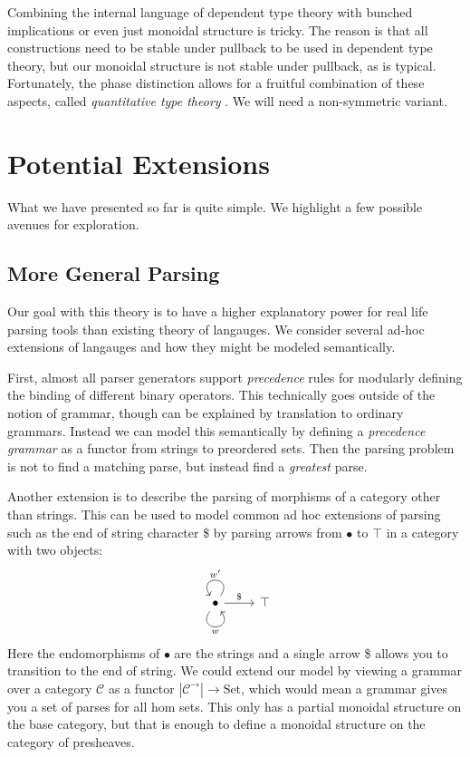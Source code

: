 \documentclass[12pt]{article}
\newcommand{\Set}{\textrm{Set}}
\begin{document}
Combining the internal language of dependent type theory with bunched
implications or even just monoidal structure is tricky. The reason is
that all constructions need to be stable under pullback to be used in
dependent type theory, but our monoidal structure is not stable under
pullback, as is typical.
%
Fortunately, the phase distinction allows for a fruitful combination
of these aspects, called \emph{quantitative type theory}
\cite{atkey-qtt,mcbride-nuttin}.
%
We will need a non-symmetric variant.

\section{Potential Extensions}

What we have presented so far is quite simple. We highlight a few
possible avenues for exploration.

\subsection{More General Parsing}

Our goal with this theory is to have a higher explanatory power for
real life parsing tools than existing theory of langauges. We consider
several ad-hoc extensions of langauges and how they might be modeled
semantically.

First, almost all parser generators support \emph{precedence} rules
for modularly defining the binding of different binary operators.
This technically goes outside of the notion of grammar, though can be
explained by translation to ordinary grammars.
%
Instead we can model this semantically by defining a \emph{precedence
grammar} as a functor from strings to preordered sets. Then the
parsing problem is not to find a matching parse, but instead find a
\emph{greatest} parse.

Another extension is to describe the parsing of morphisms of a
category other than strings. This can be used to model common ad hoc
extensions of parsing such as the end of string character \$ by
parsing arrows from $\bullet$ to $\top$ in a category with two
objects:
\[%
\begin{tikzcd}
\bullet \arrow[r, "\$"] \arrow["w"', loop, distance=2em, in=305, out=235] \arrow["w'"', loop, distance=2em, in=125, out=55] & \top
\end{tikzcd}\]
Here the endomorphisms of $\bullet$ are the strings and a single arrow
\$ allows you to transition to the end of string.  We could extend our
model by viewing a grammar over a category $\mathcal C$ as a functor
$|\mathcal C^\to| \to \Set$, which would mean a grammar gives you a
set of parses for all hom sets. This only has a partial monoidal
structure on the base category, but that is enough to define a
monoidal structure on the category of presheaves.
\end{document}
